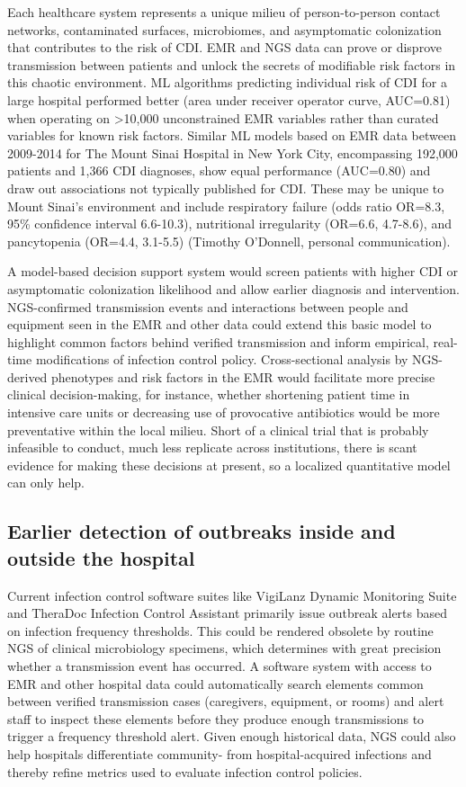 Each healthcare system represents a unique milieu of person-to-person contact networks, contaminated surfaces, microbiomes, and asymptomatic colonization that contributes to the risk of CDI. EMR and NGS data can prove or disprove transmission between patients and unlock the secrets of modifiable risk factors in this chaotic environment. ML algorithms predicting individual risk of CDI for a large hospital performed better (area under receiver operator curve, AUC=0.81) when operating on >10,000 unconstrained EMR variables rather than curated variables for known risk factors.\autocite{Wiens2014} Similar ML models based on EMR data between 2009-2014 for The Mount Sinai Hospital in New York City, encompassing 192,000 patients and 1,366 CDI diagnoses, show equal performance (AUC=0.80) and draw out associations not typically published for CDI. These may be unique to Mount Sinai’s environment and include respiratory failure (odds ratio OR=8.3, 95\% confidence interval 6.6-10.3), nutritional irregularity (OR=6.6, 4.7-8.6), and pancytopenia (OR=4.4, 3.1-5.5) (Timothy O’Donnell, personal communication).

A model-based decision support system would screen patients with higher CDI or asymptomatic colonization likelihood and allow earlier diagnosis and intervention. NGS-confirmed transmission events and interactions between people and equipment seen in the EMR and other data could extend this basic model to highlight common factors behind verified transmission and inform empirical, real-time modifications of infection control policy. Cross-sectional analysis by NGS-derived phenotypes and risk factors in the EMR would facilitate more precise clinical decision-making, for instance, whether shortening patient time in intensive care units or decreasing use of provocative antibiotics would be more preventative within the local milieu.  Short of a clinical trial that is probably infeasible to conduct, much less replicate across institutions, there is scant evidence for making these decisions at present, so a localized quantitative model can only help.

\subsection{Earlier detection of outbreaks inside and outside the hospital}

Current infection control software suites like VigiLanz Dynamic Monitoring Suite and TheraDoc Infection Control Assistant primarily issue outbreak alerts based on infection frequency thresholds. This could be rendered obsolete by routine NGS of clinical microbiology specimens, which determines with great precision whether a transmission event has occurred.\autocite{Didelot2012,Koser2012} A software system with access to EMR and other hospital data could automatically search elements common between verified transmission cases (caregivers, equipment, or rooms) and alert staff to inspect these elements before they produce enough transmissions to trigger a frequency threshold alert. Given enough historical data, NGS could also help hospitals differentiate community- from hospital-acquired infections and thereby refine metrics used to evaluate infection control policies.

